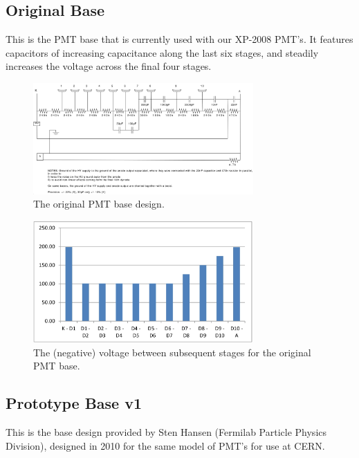 \documentclass[11pt]{article}
\begin{document}
\subsection{Original Base}

This is the PMT base that is currently used with our XP-2008 PMT's. It features capacitors of increasing capacitance along the last six stages, and steadily increases the voltage across the final four stages.

\begin{figure}[h]
    \centerline{
    \mbox{\includegraphics[width=0.75\textwidth]{pmt.png}}
    }
    \caption{The original PMT base design.}
    \label{fig:original-board}
\end{figure}

\begin{figure}[h]
    \centerline{
    \mbox{\includegraphics[width=0.75\textwidth]{original-volt.jpg}}
    }
    \caption{The (negative) voltage between subsequent stages for the original PMT base.}
    \label{fig:original-volt}
\end{figure}

\subsection{Prototype Base v1}

This is the base design provided by Sten Hansen (Fermilab Particle Physics Division), designed in 2010 for the same model of PMT's for use at CERN. 
\end{document}
